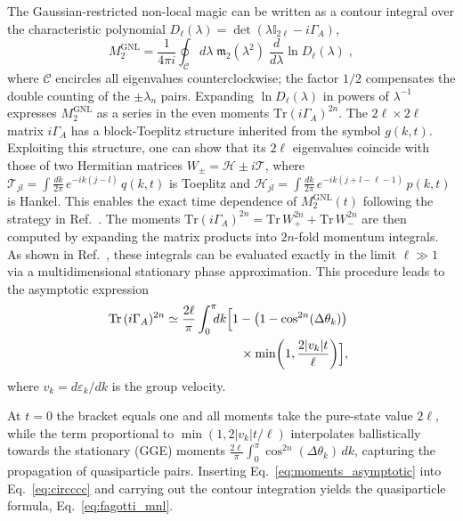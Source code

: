 \documentclass[aps,prl,twocolumn,superscriptaddress,reprint,longbibliography,nofootinbib]{revtex4-2}
\begin{document}
The Gaussian-restricted non-local magic can be written as a contour integral over the characteristic polynomial $D_\ell(\lambda) = \det(\lambda \mathbb{I}_{2\ell} - i\Gamma_A)$,
\begin{equation}
    M_2^{\mathrm{GNL}} = \frac{1}{4\pi i}\oint_\mathcal{C}d\lambda\;\mathfrak{m}_2(\lambda^2)\;\frac{d}{d\lambda}\ln D_\ell(\lambda)\;,\label{eq:circccc}
\end{equation}
where $\mathcal{C}$ encircles all eigenvalues counterclockwise; the factor $1/2$ compensates the double counting of the $\pm\lambda_n$ pairs.
Expanding $\ln D_\ell(\lambda)$ in powers of $\lambda^{-1}$ expresses $M_2^{\mathrm{GNL}}$ as a series in the even moments $\mathrm{Tr}(i\Gamma_A)^{2n}$.
The $2\ell \times 2\ell$ matrix $i\Gamma_A$ has a block-Toeplitz structure inherited from the symbol $g(k,t)$.
Exploiting this structure, one can show that its $2\ell$ eigenvalues coincide with those of two Hermitian matrices $W_\pm = \mathcal{H} \pm i\mathcal{T}$, where $\mathcal{T}_{jl} = \int \frac{dk}{2\pi}\,e^{-ik(j-l)}\,q(k,t)$ is Toeplitz and $\mathcal{H}_{jl} = \int \frac{dk}{2\pi}\,e^{-ik(j+l-\ell-1)}\,p(k,t)$ is Hankel. This enables the exact time dependence of $M_2^\mathrm{GNL}(t)$ following the strategy in Ref.~\cite{Fagotti2008}. 
The moments $\mathrm{Tr}(i\Gamma_A)^{2n} = \mathrm{Tr}\,W_+^{2n} + \mathrm{Tr}\,W_-^{2n}$ are then computed by expanding the matrix products into $2n$-fold momentum integrals.
As shown in Ref.~\cite{Fagotti2008}, these integrals can be evaluated exactly in the limit $\ell \gg 1$ via a multidimensional stationary phase approximation.
This procedure leads to the asymptotic expression\begin{equation}
\begin{split}
   \!\!\! \mathrm{Tr}\,(i\Gamma_A)^{2n}&\simeq \frac{2\ell}{\pi}\int_0^\pi\!\!\!dk\Bigl[1-\bigl(1-\cos^{2n}(\Delta\theta_k)\bigr)\\
   &\qquad\qquad\qquad\times\min\!\left(1, \frac{2|v_k|t}{\ell}\right)\Bigr],
\end{split}
\label{eq:moments_asymptotic}
\end{equation}
where $v_k = d\varepsilon_k/dk$ is the group velocity.

At $t=0$ the bracket equals one and all moments take the pure-state value $2\ell$, while the term proportional to $\min(1,2|v_k|t/\ell)$ interpolates ballistically towards  the stationary (GGE) moments $\frac{2\ell}{\pi}\int_0^\pi\cos^{2n}(\Delta\theta_k)\,dk$, capturing the propagation of quasiparticle pairs.
Inserting Eq.~\eqref{eq:moments_asymptotic} into Eq.~\eqref{eq:circccc} and carrying out the contour integration yields the quasiparticle formula, Eq.~\eqref{eq:fagotti_mnl}.
\end{document}
